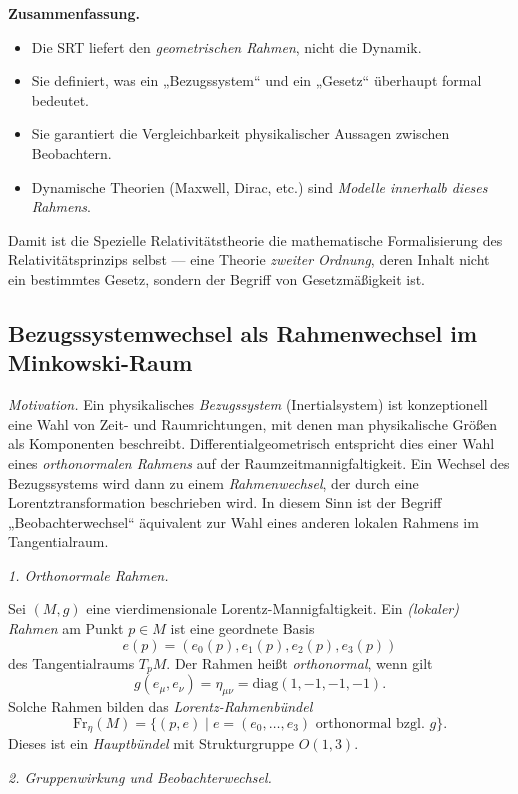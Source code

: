 \documentclass[10pt, letterpaper]{article}
\begin{document}
\textbf{Zusammenfassung.}
\begin{itemize}
  \item Die SRT liefert den \emph{geometrischen Rahmen}, nicht die Dynamik.
  \item Sie definiert, was ein „Bezugssystem“ und ein „Gesetz“ überhaupt formal bedeutet.
  \item Sie garantiert die Vergleichbarkeit physikalischer Aussagen zwischen Beobachtern.
  \item Dynamische Theorien (Maxwell, Dirac, etc.) sind \emph{Modelle innerhalb dieses Rahmens}.
\end{itemize}

Damit ist die Spezielle Relativitätstheorie die mathematische Formalisierung
des Relativitätsprinzips selbst — eine Theorie \emph{zweiter Ordnung}, 
deren Inhalt nicht ein bestimmtes Gesetz, sondern der Begriff von Gesetzmäßigkeit ist.


\pagebreak


\subsection{Bezugssystemwechsel als Rahmenwechsel im Minkowski-Raum}

\emph{Motivation.}
Ein physikalisches \emph{Bezugssystem} (Inertialsystem) ist konzeptionell eine Wahl von 
Zeit- und Raumrichtungen, mit denen man physikalische Größen als Komponenten beschreibt.
Differentialgeometrisch entspricht dies einer Wahl eines \emph{orthonormalen Rahmens} 
auf der Raumzeitmannigfaltigkeit.  
Ein Wechsel des Bezugssystems wird dann zu einem \emph{Rahmenwechsel}, der durch eine
Lorentztransformation beschrieben wird.  
In diesem Sinn ist der Begriff „Beobachterwechsel“ äquivalent zur 
Wahl eines anderen lokalen Rahmens im Tangentialraum.

\bigskip
\emph{1. Orthonormale Rahmen.}

Sei $(M,g)$ eine vierdimensionale Lorentz-Mannigfaltigkeit.
Ein \emph{(lokaler) Rahmen} am Punkt $p\in M$ ist eine geordnete Basis
\[
e(p)=(e_0(p),e_1(p),e_2(p),e_3(p))
\]
des Tangentialraums $T_pM$.
Der Rahmen heißt \emph{orthonormal}, wenn gilt
\[
g(e_\mu,e_\nu) = \eta_{\mu\nu} = \mathrm{diag}(1,-1,-1,-1).
\]
Solche Rahmen bilden das \emph{Lorentz-Rahmenbündel}
\[
\mathrm{Fr}_\eta(M)
= \{ (p,e) \mid e=(e_0,\ldots,e_3) \text{ orthonormal bzgl. } g \}.
\]
Dieses ist ein \emph{Hauptbündel} mit Strukturgruppe $O(1,3)$.

\bigskip
\emph{2. Gruppenwirkung und Beobachterwechsel.}
\end{document}
